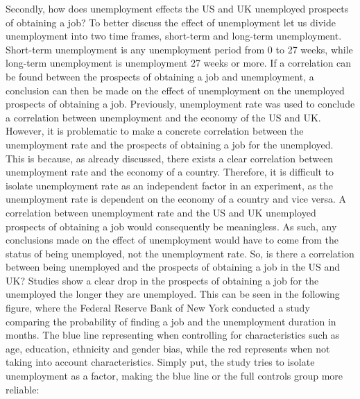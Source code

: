 Secondly, how does unemployment effects the US and UK unemployed prospects of obtaining a job?
To better discuss the effect of unemployment let us divide unemployment into two time frames, short-term and long-term unemployment.
Short-term unemployment is any unemployment period from 0 to 27 weeks, while long-term unemployment is unemployment 27 weeks or more.
If a correlation can be found between the prospects of obtaining a job and unemployment, a conclusion can then be made on the effect of unemployment on the unemployed prospects of obtaining a job.
Previously, unemployment rate was used to conclude a correlation between unemployment and the economy of the US and UK.
However, it is problematic to make a concrete correlation between the unemployment rate and the prospects of obtaining a job for the unemployed.
This is because, as already discussed, there exists a clear correlation between unemployment rate and the economy of a country.
Therefore, it is difficult to isolate unemployment rate as an independent factor in an experiment, as the unemployment rate is dependent on the economy of a country and vice versa.
A correlation between unemployment rate and the US and UK unemployed prospects of obtaining a job would consequently be meaningless.
As such, any conclusions made on the effect of unemployment would have to come from the status of being unemployed, not the unemployment rate.
So, is there a correlation between being unemployed and the prospects of obtaining a job in the US and UK?
Studies show a clear drop in the prospects of obtaining a job for the unemployed the longer they are unemployed.
This can be seen in the following figure, where the Federal Reserve Bank of New York conducted a study comparing the probability of finding a job and the unemployment duration in months.
The blue line representing when controlling for characteristics such as age, education, ethnicity and gender bias, while the red represents when not taking into account characteristics.
Simply put, the study tries to isolate unemployment as a factor, making the blue line or the full controls group more reliable: \\


